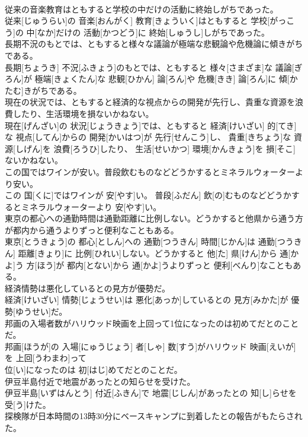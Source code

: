 \documentclass[8pt]{extreport}
\begin{document}
\begin{CJK}{UTF8}{min}
\\	従来の音楽教育はともすると学校の中だけの活動に終始しがちであった。	
\\	従来[じゅうらい]の 音楽[おんがく] 教育[きょういく]はともすると 学校[がっこう]の 中[なか]だけの 活動[かつどう]に 終始[しゅうし]しがちであった。
\\	長期不況のもとでは、ともすると様々な議論が極端な悲観論や危機論に傾きがちである。	
\\	長期[ちょうき] 不況[ふきょう]のもとでは、ともすると 様々[さまざま]な 議論[ぎろん]が 極端[きょくたん]な 悲観[ひかん] 論[ろん]や 危機[きき] 論[ろん]に 傾[かたむ]きがちである。
\\	現在の状況では、ともすると経済的な視点からの開発が先行し、貴重な資源を浪費したり、生活環境を損ないかねない。	
\\	現在[げんざい]の 状況[じょうきょう]では、ともすると 経済[けいざい] 的[てき]な 視点[してん]からの 開発[かいはつ]が 先行[せんこう]し、 貴重[きちょう]な 資源[しげん]を 浪費[ろうひ]したり、 生活[せいかつ] 環境[かんきょう]を 損[そこ]ないかねない。
\\	この国ではワインが安い。普段飲むものなどどうかするとミネラルウォーターより安い。	
\\	この 国[くに]ではワインが 安[やす]い。 普段[ふだん] 飲[の]むものなどどうかするとミネラルウォーターより 安[やす]い。
\\	東京の都心への通勤時間は通勤距離に比例しない。どうかすると他県から通う方が都内から通うよりずっと便利なこともある。	
\\	東京[とうきょう]の 都心[としん]への 通勤[つうきん] 時間[じかん]は 通勤[つうきん] 距離[きょり]に 比例[ひれい]しない。どうかすると 他[た] 県[けん]から 通[かよ]う 方[ほう]が 都内[とない]から 通[かよ]うよりずっと 便利[べんり]なこともある。
\\	経済情勢は悪化しているとの見方が優勢だ。	
\\	経済[けいざい] 情勢[じょうせい]は 悪化[あっか]しているとの 見方[みかた]が 優勢[ゆうせい]だ。
\\	邦画の入場者数がハリウッド映画を上回って1位になったのは初めてだとのことだ。	
\\	邦画[ほうが]の 入場[にゅうじょう] 者[しゃ] 数[すう]がハリウッド 映画[えいが]を 上回[うわまわ]って 
\\	位[い]になったのは 初[はじ]めてだとのことだ。
\\	伊豆半島付近で地震があったとの知らせを受けた。	
\\	伊豆半島[いずはんとう] 付近[ふきん]で 地震[じしん]があったとの 知[し]らせを 受[う]けた。
\\	探検隊が日本時間の13時30分にベースキャンプに到着したとの報告がもたらされた。	

\end{CJK}
\end{document}
